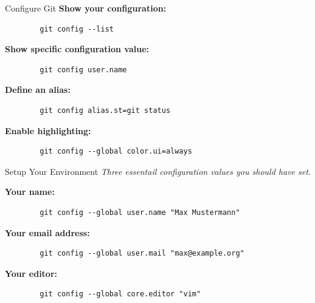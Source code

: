 



\begin{frame}[fragile]{Configure Git}
    \textbf{Show your configuration:}
    \begin{lstlisting}
        git config --list
    \end{lstlisting}
    \textbf{Show specific configuration value:}
    \begin{lstlisting}
        git config user.name
    \end{lstlisting}
    \textbf{Define an alias:}
    \begin{lstlisting}
        git config alias.st=git status
    \end{lstlisting}
    \textbf{Enable highlighting:}
    \begin{lstlisting}
        git config --global color.ui=always
    \end{lstlisting}
\end{frame}

\begin{frame}[fragile]{Setup Your Environment}
    \emph{Three essentail configuration values you should have set.}
    \vspace{1cm}

    \textbf{Your name:}
    \begin{lstlisting}
        git config --global user.name "Max Mustermann"
    \end{lstlisting}
    \textbf{Your email address:}
    \begin{lstlisting}
        git config --global user.mail "max@example.org"
    \end{lstlisting}
    \textbf{Your editor:}
    \begin{lstlisting}
        git config --global core.editor "vim"
    \end{lstlisting}
\end{frame}

